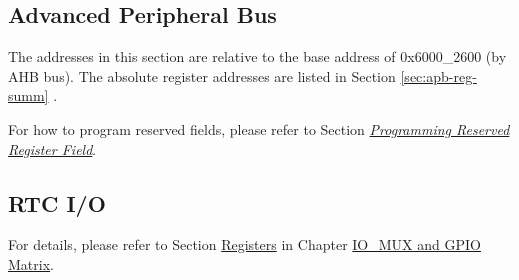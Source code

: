 \documentclass[main\_\_EN.tex]{subfiles}
\begin{document}
\subsection{Advanced Peripheral Bus}

The addresses in this section are relative to the base address of 0x6000\_2600 (by AHB bus). The absolute register addresses are listed in Section \ref{sec:apb-reg-summ} \textit{}.

For how to program reserved fields, please refer to Section \hyperref[programming-reserved-field]{\textit{Programming Reserved Register Field}}.



\subsection{RTC I/O}

For details, please refer to Section \hyperref[section:4.12]{Registers} in Chapter \hyperref[mod:iomuxgpio]{IO\_MUX and GPIO Matrix}.
\end{document}

